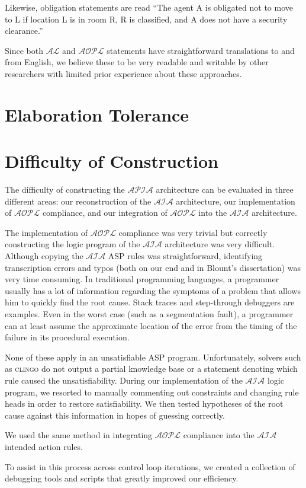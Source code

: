 Likewise, obligation statements are read ``The agent A is obligated not to move to L if location L is in room R, R is classified, and A does not have a security clearance.''

Since both $\mathcal{AL}$ and $\mathcal{AOPL}$ statements have straightforward translations to and from English, we believe these to be very readable and writable by other researchers with limited prior experience about these approaches.

\section{Elaboration Tolerance}

\section{Difficulty of Construction}

The difficulty of constructing the $\mathcal{APIA}$ architecture can be evaluated in three different areas: our reconstruction of the $\mathcal{AIA}$ architecture, our implementation of $\mathcal{AOPL}$ compliance, and our integration of $\mathcal{AOPL}$ into the $\mathcal{AIA}$ architecture.

The implementation of $\mathcal{AOPL}$ compliance was very trivial but correctly constructing the logic program of the $\mathcal{AIA}$ architecture was very difficult.
Although copying the $\mathcal{AIA}$ ASP rules was straightforward, identifying transcription errors and typos (both on our end and in Blount's dissertation) was very time consuming.
In traditional programming languages, a programmer usually has a lot of information regarding the symptoms of a problem that allows him to quickly find the root cause.
Stack traces and step-through debuggers are examples.
Even in the worst case (such as a segmentation fault), a programmer can at least assume the approximate location of the error from the timing of the failure in its procedural execution.

None of these apply in an unsatisfiable ASP program.
Unfortunately, solvers such as \textsc{clingo} do not output a partial knowledge base or a statement denoting which rule caused the unsatisfiability.
During our implementation of the $\mathcal{AIA}$ logic program, we resorted to manually commenting out constraints and changing rule heads in order to restore satisfiability.
We then tested hypotheses of the root cause against this information in hopes of guessing correctly.

We used the same method in integrating $\mathcal{AOPL}$ compliance into the $\mathcal{AIA}$ intended action rules.

To assist in this process across control loop iterations, we created a collection of debugging tools and scripts that greatly improved our efficiency.
